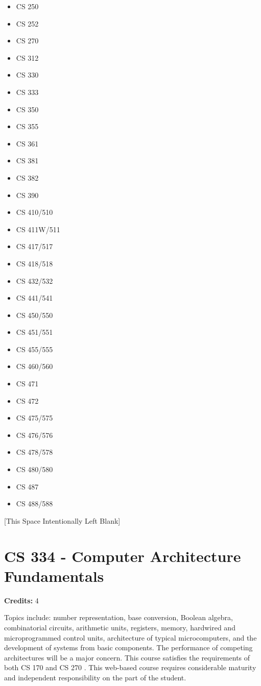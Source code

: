 \documentclass[]{article}
\providecommand{\tightlist}{%
  \setlength{\itemsep}{0pt}\setlength{\parskip}{0pt}}
\newcommand{\pagebreakhere}{
\vspace*{\fill}
\begin{center}
[This Space Intentionally Left Blank]
\end{center}
\vspace*{\fill}
\newpage
}
\begin{document}
\begin{itemize}
\tightlist
\item
  CS 250
\item
  CS 252
\item
  CS 270
\item
  CS 312
\item
  CS 330
\item
  CS 333
\item
  CS 350
\item
  CS 355
\item
  CS 361
\item
  CS 381
\item
  CS 382
\item
  CS 390
\item
  CS 410/510
\item
  CS 411W/511
\item
  CS 417/517
\item
  CS 418/518
\item
  CS 432/532
\item
  CS 441/541
\item
  CS 450/550
\item
  CS 451/551
\item
  CS 455/555
\item
  CS 460/560
\item
  CS 471
\item
  CS 472
\item
  CS 475/575
\item
  CS 476/576
\item
  CS 478/578
\item
  CS 480/580
\item
  CS 487
\item
  CS 488/588
\end{itemize}

\pagebreakhere
\section{CS 334 - Computer Architecture
Fundamentals}\label{cs-334---computer-architecture-fundamentals}

\textbf{Credits:} 4

Topics include: number representation, base conversion, Boolean algebra,
combinatorial circuits, arithmetic units, registers, memory, hardwired
and microprogrammed control units, architecture of typical
microcomputers, and the development of systems from basic components.
The performance of competing architectures will be a major concern. This
course satisfies the requirements of both CS 170 and CS 270 . This
web-based course requires considerable maturity and independent
responsibility on the part of the student.
\end{document}
